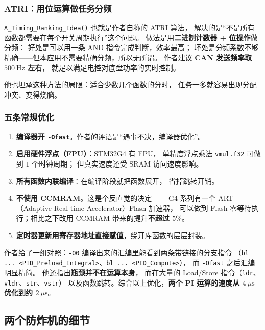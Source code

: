 \documentclass[cn,blue,11pt,device=normal]{elegantnote}
\begin{document}
\subsubsection{ATRI：用位运算做任务分频}

\texttt{A\_\allowbreak{}Timing\_\allowbreak{}Ranking\_\allowbreak{}Idea()} 也就是作者自称的 ATRI 算法，
解决的是“不是所有函数都需要在每个开关周期执行”这个问题。
做法是用\textbf{二进制计数器 + 位操作}做分频：
好处是可以用一条 AND 指令完成判断，效率最高；
坏处是分频系数不够精确——但本应用不需要精确分频，所以无所谓。
作者建议 \textbf{CAN 发送频率取 $500\ \mathrm{Hz}$ 左右}，
就足以满足电控对底盘功率的实时控制。

他也坦承这种方法的局限：适合少数几个函数的分时，
任务一多就容易出现分配冲突、变得烧脑。

\subsubsection{五条常规优化}

\begin{enumerate}
  \item \textbf{编译器开 \texttt{-Ofast}}。作者的评语是“遇事不决，编译器优化”。
  \item \textbf{启用硬件浮点（FPU）}：STM32G4 有 FPU，
  单精度浮点乘法 \texttt{vmul.f32} 可做到 $1$ 个时钟周期；
  但真实速度还受 SRAM 访问速度影响。
  \item \textbf{所有函数内联编译}：在编译阶段就把函数展开，
  省掉跳转开销。
  \item \textbf{不使用 CCMRAM}。这是个反直觉的决定——
  G4 系列有一个 ART（Adaptive Real-time Accelerator）Flash 加速器，
  可以做到 Flash 零等待执行；相比之下改用 CCMRAM 带来的提升\textbf{不超过 $5\%$}。
  \item \textbf{定时器更新用寄存器地址直接赋值}，绕开库函数的层层封装。
\end{enumerate}

作者给了一组对照：\texttt{-O0} 编译出来的汇编里能看到两条带链接的分支指令
（\texttt{bl ... <PID\_\allowbreak{}Preload\_\allowbreak{}Integral>}、\texttt{bl ... <PID\_\allowbreak{}Compute>}），
而 \texttt{-Ofast} 之后汇编明显精简。
他还指出\textbf{瓶颈并不在运算本身}，
而在大量的 Load/Store 指令（\texttt{ldr}、\texttt{vldr}、\texttt{str}、\texttt{vstr}）
以及函数跳转。综合以上优化，\textbf{两个 PI 运算的速度从 $4\ \mu\mathrm{s}$ 优化到约 $2\ \mu\mathrm{s}$}。

\subsection{两个防炸机的细节}
\end{document}
